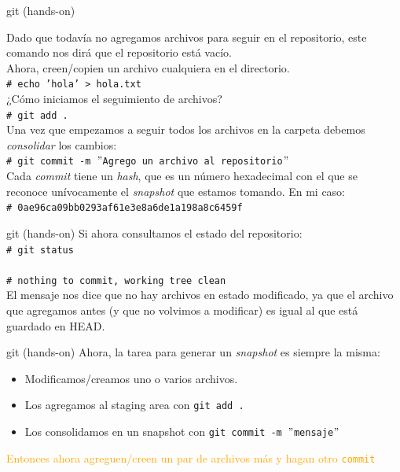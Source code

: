 \documentclass{beamer}
\newcommand{\shellcmd}[1]{\\\indent\indent\texttt{\footnotesize\# #1}\\}
\begin{document}
\begin{frame}{git (hands-on)}

  \noindent Dado que todavía no agregamos archivos para seguir en el repositorio, este comando nos dirá que el repositorio está vacío. \\ Ahora, creen/copien un archivo cualquiera en el directorio.
  \shellcmd{echo 'hola' > hola.txt}
  
  \noindent ¿Cómo iniciamos el seguimiento de archivos?
  \shellcmd{git add .}

  \noindent Una vez que empezamos a seguir todos los archivos en la carpeta debemos \textit{consolidar} los cambios:
  \shellcmd{git commit -m  $"$Agrego un archivo al repositorio$"$}
  
  \noindent Cada \textit{commit} tiene un \textit{hash}, que es un número hexadecimal con el que se reconoce unívocamente el \textit{snapshot} que estamos tomando. En mi caso:
  \shellcmd{0ae96ca09bb0293af61e3e8a6de1a198a8c6459f}
\end{frame}

\begin{frame}{git (hands-on)}
  \noindent Si ahora consultamos el estado del repositorio:
  \shellcmd{git status}

  \shellcmd{nothing to commit, working tree clean}

El mensaje nos dice que no hay archivos en estado
modificado, ya que el archivo que agregamos antes (y que no volvimos a modificar) es
igual al que está guardado en HEAD.
\end{frame}

\begin{frame}{git (hands-on)}
Ahora, la tarea para generar un \textit{snapshot} es siempre la misma:
\begin{itemize}
    \item Modificamos/creamos uno o varios archivos.
    \item Los agregamos al staging area con \texttt{git add . }
    \item Los consolidamos en un snapshot con \texttt{git commit -m $"$mensaje$"$}
\end{itemize}
\vspace{1cm}
\textcolor{orange}{Entonces ahora agreguen/creen un par de archivos más y hagan otro  \texttt{commit} }


\end{frame}
\end{document}
